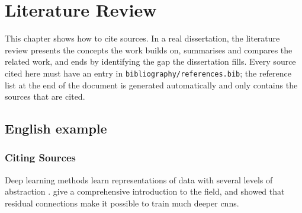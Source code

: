 \chapter{Literature Review}
\label{chap:review}

This chapter shows how to cite sources. In a real dissertation, the
literature review presents the concepts the work builds on, summarises and
compares the related work, and ends by identifying the gap the dissertation
fills. Every source cited here must have an entry in
\texttt{bibliography/references.bib}; the reference list at the end of the
document is generated automatically and only contains the sources that are
cited.

\section{English example}
\label{sec:review:en}

\subsection{Citing Sources}
\label{sec:review:citing}

Deep learning methods learn representations of data with several levels of
abstraction \cite{LeCun2015}. \textcite{Goodfellow2016} give a comprehensive
introduction to the field, and \textcite{He2016} showed that residual
connections make it possible to train much deeper \glspl{cnn}.

